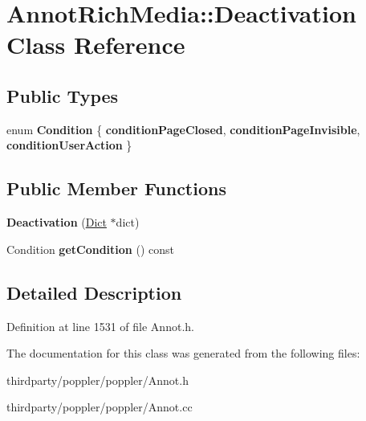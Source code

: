 \hypertarget{class_annot_rich_media_1_1_deactivation}{}\section{Annot\+Rich\+Media\+:\+:Deactivation Class Reference}
\label{class_annot_rich_media_1_1_deactivation}
\subsection*{Public Types}
\begin{DoxyCompactItemize}
\item 
\mbox{\label{class_annot_rich_media_1_1_deactivation_a0cdf9823347ab32507ba5710bae2ea40}} 
enum {\bfseries Condition} \{ {\bfseries condition\+Page\+Closed}, 
{\bfseries condition\+Page\+Invisible}, 
{\bfseries condition\+User\+Action}
 \}
\end{DoxyCompactItemize}
\subsection*{Public Member Functions}
\begin{DoxyCompactItemize}
\item 
\mbox{\label{class_annot_rich_media_1_1_deactivation_aeaef976e115038ee7fcf92ed1a64a9cb}} 
{\bfseries Deactivation} (\hyperlink{class_dict}{Dict} $\ast$dict)
\item 
\mbox{\label{class_annot_rich_media_1_1_deactivation_a5594c48bc4e9e9b0c2ffeb3b1d6ef014}} 
Condition {\bfseries get\+Condition} () const
\end{DoxyCompactItemize}


\subsection{Detailed Description}


Definition at line 1531 of file Annot.\+h.



The documentation for this class was generated from the following files\+:\begin{DoxyCompactItemize}
\item 
thirdparty/poppler/poppler/Annot.\+h\item 
thirdparty/poppler/poppler/Annot.\+cc\end{DoxyCompactItemize}
